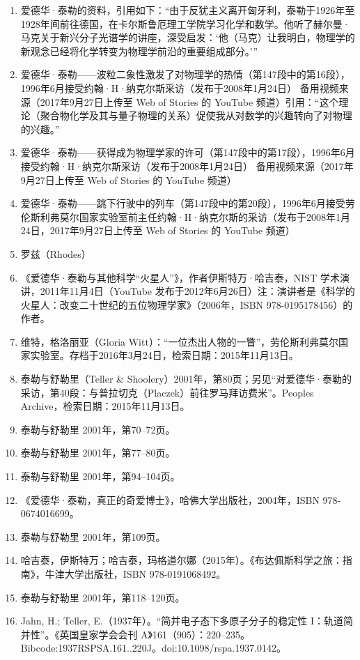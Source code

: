 \begin{enumerate}
\item 爱德华·泰勒的资料，引用如下：“由于反犹主义离开匈牙利，泰勒于1926年至1928年间前往德国，在卡尔斯鲁厄理工学院学习化学和数学。他听了赫尔曼·马克关于新兴分子光谱学的讲座，深受启发：‘他（马克）让我明白，物理学的新观念已经将化学转变为物理学前沿的重要组成部分。’”
\item 爱德华·泰勒——波粒二象性激发了对物理学的热情（第147段中的第16段），1996年6月接受约翰·H·纳克尔斯采访（发布于2008年1月24日）
备用视频来源（2017年9月27日上传至 Web of Stories 的 YouTube 频道）引用：“这个理论（聚合物化学及其与量子物理的关系）促使我从对数学的兴趣转向了对物理的兴趣。”
\item 爱德华·泰勒——获得成为物理学家的许可（第147段中的第17段），1996年6月接受约翰·H·纳克尔斯采访（发布于2008年1月24日）
备用视频来源（2017年9月27日上传至 Web of Stories 的 YouTube 频道）
\item 爱德华·泰勒——跳下行驶中的列车（第147段中的第20段），1996年6月接受劳伦斯利弗莫尔国家实验室前主任约翰·H·纳克尔斯的采访（发布于2008年1月24日，2017年9月27日上传至 Web of Stories 的 YouTube 频道）
\item 罗兹（Rhodes）
\item 《爱德华·泰勒与其他科学“火星人”》，作者伊斯特万·哈吉泰，NIST 学术演讲，2011年11月4日（YouTube 发布于2012年6月26日）注：演讲者是《科学的火星人：改变二十世纪的五位物理学家》（2006年，ISBN 978-0195178456）的作者。
\item 维特，格洛丽亚（Gloria Witt）：“一位杰出人物的一瞥”，劳伦斯利弗莫尔国家实验室。存档于2016年3月24日，检索日期：2015年11月13日。
\item 泰勒与舒勒里（Teller & Shoolery）2001年，第80页；另见“对爱德华·泰勒的采访，第40段：与普拉切克（Placzek）前往罗马拜访费米”。Peoples Archive，检索日期：2015年11月13日。
\item 泰勒与舒勒里 2001年，第70–72页。
\item 泰勒与舒勒里 2001年，第77–80页。
\item 泰勒与舒勒里 2001年，第94–104页。
\item 《爱德华·泰勒，真正的奇爱博士》，哈佛大学出版社，2004年，ISBN 978-0674016699。
\item 泰勒与舒勒里 2001年，第109页。
\item 哈吉泰，伊斯特万；哈吉泰，玛格道尔娜（2015年）。《布达佩斯科学之旅：指南》，牛津大学出版社，ISBN 978-0191068492。
\item 泰勒与舒勒里 2001年，第118–120页。
\item Jahn, H.; Teller, E.（1937年）。“简并电子态下多原子分子的稳定性 I：轨道简并性”。《英国皇家学会会刊 A》161（905）：220–235。Bibcode:1937RSPSA.161..220J。doi:10.1098/rspa.1937.0142。

\end{enumerate}
